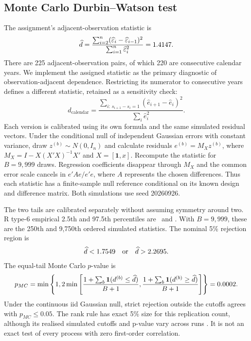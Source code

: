 \documentclass[11pt,a4paper]{article}
\begin{document}
\subsection{Monte Carlo Durbin--Watson test}
The assignment's adjacent-observation statistic is
\begin{equation}\widehat d=\frac{\sum_{i=2}^n(\widehat\varepsilon_i-\widehat\varepsilon_{i-1})^2}{\sum_{i=1}^n\widehat\varepsilon_i^2}=1.4147.\end{equation}
There are 225 adjacent-observation pairs, of which 220 are consecutive calendar years. We implement the assigned statistic as the primary diagnostic of observation-adjacent dependence. Restricting its numerator to consecutive years defines a different statistic, retained as a sensitivity check:
\[
d_{\mathrm{calendar}}=
\frac{\sum_{i:\,s_{i+1}-s_i=1}(\widehat e_{i+1}-\widehat e_i)^2}
{\sum_i\widehat e_i^2}.
\]
Each version is calibrated using its own formula and the same simulated residual vectors. Under the conditional null of independent Gaussian errors with constant variance, draw $z^{(b)}\sim N(0,I_n)$ and calculate residuals $e^{(b)}=M_Xz^{(b)}$, where $M_X=I-X(X'X)^{-1}X'$ and $X=[\mathbf1,x]$. Recompute the statistic for $B=9,999$ draws. Regression coefficients disappear through $M_X$ and the common error scale cancels in $e'Ae/e'e$, where $A$ represents the chosen differences. Thus each statistic has a finite-sample null reference conditional on its known design and difference matrix. Both simulations use seed 20260926.

The two tails are calibrated separately without assuming symmetry around two. R type-6 empirical 2.5th and 97.5th percentiles are \DWLower\ and \DWUpper. With $B=9,999$, these are the 250th and 9,750th ordered simulated statistics. The nominal 5\% rejection region is
\[\widehat d<1.7549\quad\text{or}\quad\widehat d>2.2695.\]
The equal-tail Monte Carlo $p$-value is
\begin{equation}
 p_{MC}=\min\left\{1,2\min\left[\frac{1+\sum_b\mathbf1(d^{(b)}\leq\widehat d)}{B+1},\frac{1+\sum_b\mathbf1(d^{(b)}\geq\widehat d)}{B+1}\right]\right\}=0.0002.
\end{equation}
Under the continuous iid Gaussian null, strict rejection outside the cutoffs agrees with $p_{MC}\leq0.05$. The rank rule has exact 5\% size for this replication count, although its realised simulated cutoffs and p-value vary across runs \cite{dufour}. It is not an exact test of every process with zero first-order correlation.

\begin{table}[htbp]\centering\small
\caption{Two-sided DW Monte Carlo tests using 9,999 common simulated residual vectors, separately calibrated for each definition.}\label{tab:dw}
\end{table}
\end{document}
